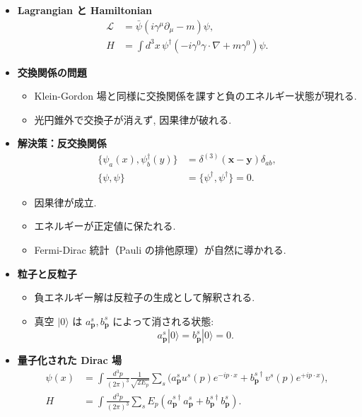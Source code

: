 \documentclass[a4paper,12pt]{article}
\begin{document}
\begin{itemize}
  \item \textbf{Lagrangian と Hamiltonian}
  \begin{align*}
  \mathcal{L} &= \bar{\psi}(i\gamma^\mu \partial_\mu - m)\psi, \\
  H &= \int d^3x \, \psi^\dagger(-i\gamma^0 \gamma\cdot\nabla + m\gamma^0)\psi .
  \end{align*}

  \item \textbf{交換関係の問題}
  \begin{itemize}
    \item Klein-Gordon 場と同様に交換関係を課すと負のエネルギー状態が現れる.
    \item 光円錐外で交換子が消えず, 因果律が破れる.
  \end{itemize}

  \item \textbf{解決策：反交換関係}
  \begin{align*}
  \{\psi_a(x), \psi_b^\dagger(y)\} &= \delta^{(3)}(\mathbf{x}-\mathbf{y})\delta_{ab}, \\
  \{\psi,\psi\} &= \{\psi^\dagger,\psi^\dagger\}=0 .
  \end{align*}
  \begin{itemize}
    \item 因果律が成立.
    \item エネルギーが正定値に保たれる.
    \item Fermi-Dirac 統計（Pauli の排他原理）が自然に導かれる.
  \end{itemize}

  \item \textbf{粒子と反粒子}
  \begin{itemize}
    \item 負エネルギー解は反粒子の生成として解釈される.
    \item 真空 $|0\rangle$ は $a^s_{\mathbf{p}}, b^s_{\mathbf{p}}$ によって消される状態:
    \[
    a^s_{\mathbf{p}}|0\rangle = b^s_{\mathbf{p}}|0\rangle = 0 .
    \]
  \end{itemize}

  \item \textbf{量子化された Dirac 場}
  \begin{align*}
  \psi(x) &= \int \frac{d^3p}{(2\pi)^3}\frac{1}{\sqrt{2E_p}}
    \sum_s \Big( a^s_{\mathbf{p}} u^s(p)e^{-ip\cdot x} 
    + b^{s\dagger}_{\mathbf{p}} v^s(p)e^{+ip\cdot x} \Big), \\
  H &= \int \frac{d^3p}{(2\pi)^3} \sum_s 
    E_p \left( a^{s\dagger}_{\mathbf{p}} a^s_{\mathbf{p}} 
    + b^{s\dagger}_{\mathbf{p}} b^s_{\mathbf{p}} \right).
  \end{align*}


\end{itemize}
\end{document}
